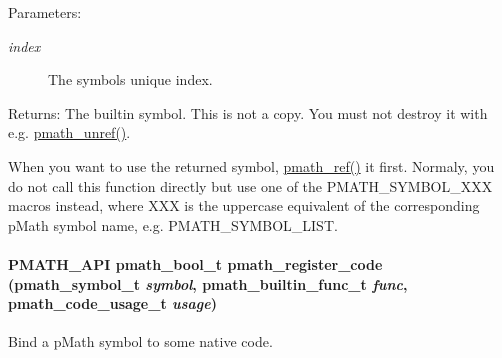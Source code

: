 \begin{Desc}
\item[Parameters:]
\begin{description}
\item[{\em index}]The symbols unique index. \end{description}
\end{Desc}
\begin{Desc}
\item[Returns:]The builtin symbol. This is not a copy. You must not destroy it with e.g. \hyperlink{classpmath__t_54e905402c38940687033b87eb8c6c9f}{pmath\_\-unref()}.\end{Desc}
When you want to use the returned symbol, \hyperlink{classpmath__t_42cd678b691046a58dede518315c6b13}{pmath\_\-ref()} it first. Normaly, you do not call this function directly but use one of the PMATH\_\-SYMBOL\_\-XXX macros instead, where XXX is the uppercase equivalent of the corresponding pMath symbol name, e.g. PMATH\_\-SYMBOL\_\-LIST. \hypertarget{group__symbols_gd02a05fa96992d137b450627486ec0b5}{
\paragraph[{pmath\_\-register\_\-code}]{\setlength{\rightskip}{0pt plus 5cm}PMATH\_\-API {\bf pmath\_\-bool\_\-t} pmath\_\-register\_\-code ({\bf pmath\_\-symbol\_\-t} {\em symbol}, \/  {\bf pmath\_\-builtin\_\-func\_\-t} {\em func}, \/  {\bf pmath\_\-code\_\-usage\_\-t} {\em usage})}\hfill}
\label{group__symbols_gd02a05fa96992d137b450627486ec0b5}


Bind a pMath symbol to some native code. 

